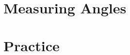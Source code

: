 \documentclass{article}[12pt]
\theoremstyle{definition}
\theoremstyle{example}
\theoremstyle{theorem}
\begin{document}
\section{Measuring Angles}

\section{Practice}
\end{document}
